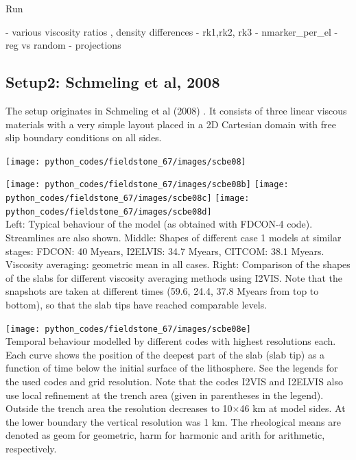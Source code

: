 Run 

- various viscosity ratios , density differences
- rk1,rk2, rk3
- nmarker\_per\_el
- reg vs random
- projections




\subsection*{Setup2: Schmeling et al, 2008}

The setup originates in Schmeling et al (2008) \cite{scbe08}. It consists of three linear viscous
materials with a very simple layout placed in a 2D Cartesian domain with free slip boundary conditions 
on all sides. 

\begin{center}
\texttt{[image: python\_codes/fieldstone\_67/images/scbe08]}
\end{center}

\begin{center}
\texttt{[image: python\_codes/fieldstone\_67/images/scbe08b]}
\texttt{[image: python\_codes/fieldstone\_67/images/scbe08c]}
\texttt{[image: python\_codes/fieldstone\_67/images/scbe08d]}\\
{\captionfont Left: Typical behaviour of the model (as obtained with FDCON-4 code). 
Streamlines are also shown.
Middle: Shapes of different case 1 models at similar stages: FDCON: 40 Myears,
I2ELVIS: 34.7 Myears, CITCOM: 38.1 Myears. Viscosity averaging: geometric mean
in all cases.
Right: Comparison of the shapes of the slabs for different viscosity averaging methods 
using I2VIS. Note that the snapshots are taken at different times (59.6, 24.4,
37.8 Myears from top to bottom), so that the slab tips have reached comparable
levels.}
\end{center}

\begin{center}
\texttt{[image: python\_codes/fieldstone\_67/images/scbe08e]}\\
{\captionfont 
Temporal behaviour modelled by different codes with highest resolutions each. 
Each curve shows the position of the deepest part of the slab (slab tip) as
a function of time below the initial surface of the lithosphere. 
See the legends for the used codes and grid resolution. 
Note that the codes I2VIS and I2ELVIS also use local
refinement at the trench area (given in parentheses in the legend). 
Outside the trench area the resolution decreases to 10$\times$46 km at model sides. 
At the lower boundary the vertical resolution was 1 km. 
The rheological means are denoted as geom for geometric, harm for harmonic 
and arith for arithmetic, respectively. }
\end{center}

